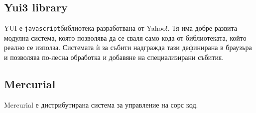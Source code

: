 \documentclass[a4paper]{article}
\def\js{\texttt{javascript}}
\begin{document}



  \subsection{Yui3 library}
  YUI \cite{yui} е \js библиотека разработвана от Yahoo!. Тя има добре развита модулна система, която позволява да се сваля само кода от библиотеката, който реално се използа. Системата ѝ за събити надгражда тази дефинирана в браузъра и позволява по-лесна обработка и добавяне на специализирани събития.

  \subsection{Mercurial}
  Mercurial \cite{mercurial} е дистрибутирана система за управление на сорс код.
\end{document}
